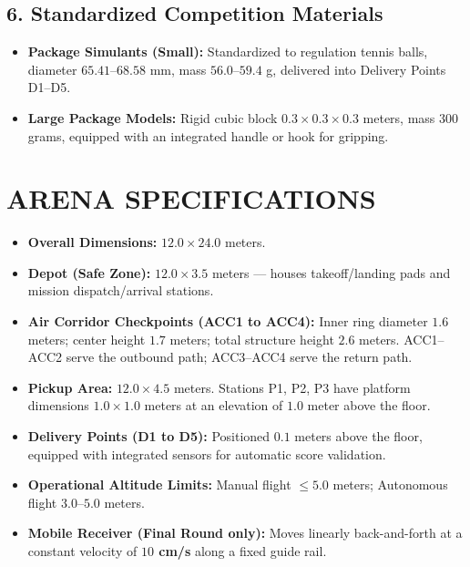 \documentclass[12pt,a4paper]{article}
\begin{document}
\subsection*{6. Standardized Competition Materials}
\begin{itemize}
\item \textbf{Package Simulants (Small):} Standardized to regulation tennis balls, diameter $65.41$–$68.58$ mm, mass $56.0$–$59.4$ g, delivered into Delivery Points D1–D5.
\item \textbf{Large Package Models:} Rigid cubic block $0.3 \times 0.3 \times 0.3$ meters, mass $300$ grams, equipped with an integrated handle or hook for gripping.
\end{itemize}

\section{ARENA SPECIFICATIONS}

\begin{itemize}
\item \textbf{Overall Dimensions:} $12.0 \times 24.0$ meters.
\item \textbf{Depot (Safe Zone):} $12.0 \times 3.5$ meters — houses takeoff/landing pads and mission dispatch/arrival stations.
\item \textbf{Air Corridor Checkpoints (ACC1 to ACC4):} Inner ring diameter $1.6$ meters; center height $1.7$ meters; total structure height $2.6$ meters. ACC1–ACC2 serve the outbound path; ACC3–ACC4 serve the return path.
\item \textbf{Pickup Area:} $12.0 \times 4.5$ meters. Stations P1, P2, P3 have platform dimensions $1.0 \times 1.0$ meters at an elevation of $1.0$ meter above the floor.
\item \textbf{Delivery Points (D1 to D5):} Positioned $0.1$ meters above the floor, equipped with integrated sensors for automatic score validation.
\item \textbf{Operational Altitude Limits:} Manual flight $\leq 5.0$ meters; Autonomous flight $3.0$–$5.0$ meters.
\item \textbf{Mobile Receiver (Final Round only):} Moves linearly back-and-forth at a constant velocity of \textbf{$10$ cm/s} along a fixed guide rail.
\end{itemize}
\end{document}
